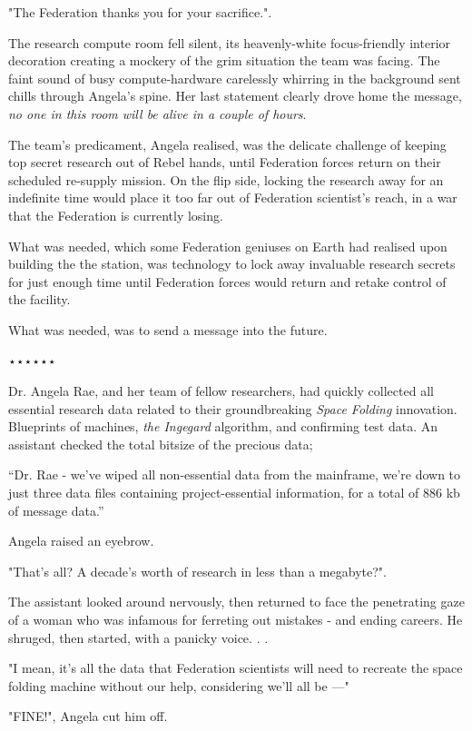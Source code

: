 \documentclass[smalldemyvopaper,11pt,twoside,onecolumn,openright,extrafontsizes]{memoir}
\begin{document}
 
 "The Federation thanks you for your sacrifice.".

 
 The research compute room fell silent, its heavenly-white focus-friendly interior decoration creating a mockery of the grim situation the team was facing. The faint sound of busy compute-hardware carelessly whirring in the background sent chills through Angela’s spine. Her last statement clearly drove home the message, \textit{no one in this room will be alive in a couple of hours}.

 
  The team’s predicament, Angela realised, was the delicate challenge of keeping top secret research out of Rebel hands, until Federation forces return on their scheduled re-supply mission. On the flip side, locking the research away for an indefinite time would place it too far out of Federation scientist’s reach, in a war that the Federation is currently losing.

 
  What was needed, which some Federation geniuses on Earth had realised upon building the the station, was technology to lock away invaluable research secrets for just enough time until Federation forces would return and retake control of the facility.

 What was needed, was to send a message into the future.

⋆⋆⋆⋆⋆⋆

Dr. Angela Rae, and her team of fellow researchers, had quickly collected all essential research data related to their groundbreaking \textit{Space Folding} innovation. Blueprints of machines, \textit{the Ingegard} algorithm, and confirming test data. An assistant checked the total bitsize of the precious data;

 
“Dr. Rae - we’ve wiped all non-essential data from the mainframe, we’re down to just three data files containing project-essential information, for a total of 886 kb of message data.”

 
  Angela raised an eyebrow.

 
 "That’s all? A decade’s worth of research in less than a megabyte?".

 
 The assistant looked around nervously, then returned to face the penetrating gaze of a woman who was infamous for ferreting out mistakes - and ending careers. He shruged, then started, with a panicky voice. . .

 
 "I mean, it’s all the data that Federation scientists will need to recreate the space folding machine without our help, considering we’ll all be —"

 
 "FINE!", Angela cut him off.
\end{document}
